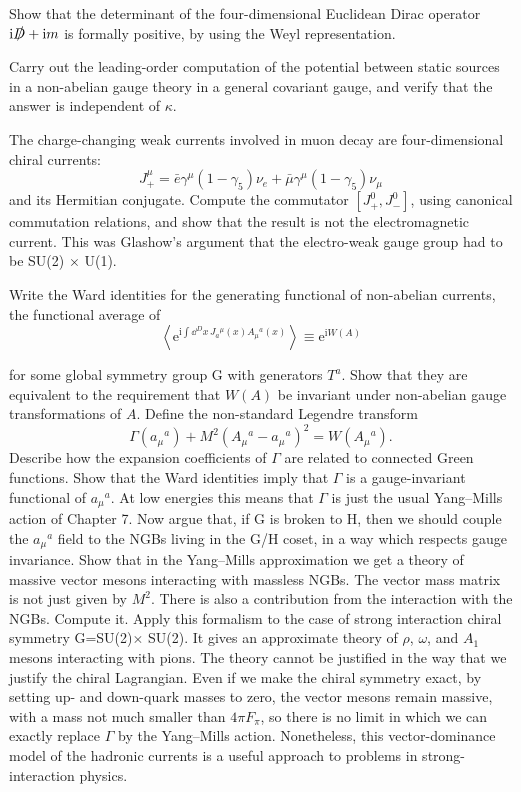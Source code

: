 \begin{banksproblems}
Show that the determinant of the four-dimensional Euclidean Dirac operator
$\mathrm{i}\slashed D+\mathrm{i}m$ is formally positive, by using the Weyl
representation.

Carry out the leading-order computation of the potential between static
sources in a non-abelian gauge theory in a general covariant gauge, and verify
that the answer is independent of $\kappa$.

The charge-changing weak currents involved in muon decay are four-dimensional
chiral currents:
\[
  J_+^\mu=\bar e\gamma^\mu(1-\gamma_5)\nu_e
  +\bar\mu\gamma^\mu(1-\gamma_5)\nu_\mu
\]
and its Hermitian conjugate. Compute the commutator $[J_+^0,J_-^0]$, using
canonical commutation relations, and show that the result is not the
electromagnetic current. This was Glashow's argument that the electro-weak
gauge group had to be SU(2) $\times$ U(1).

Write the Ward identities for the generating functional of non-abelian
currents, the functional average of
\[
  \left\langle\mathrm{e}^{\mathrm{i}\int\dd^D x\,J_a{}^\mu(x)A_\mu{}^a(x)}\right\rangle
  \equiv\mathrm{e}^{\mathrm{i}W(A)}
\]

for some global symmetry group G with generators $T^a$. Show that they are
equivalent to the requirement that $W(A)$ be invariant under non-abelian gauge
transformations of $A$. Define the non-standard Legendre transform
\[
  \Gamma(a_\mu{}^a)+M^2(A_\mu{}^a-a_\mu{}^a)^2=W(A_\mu{}^a) .
\]
Describe how the expansion coefficients of $\Gamma$ are related to connected
Green functions. Show that the Ward identities imply that $\Gamma$ is a
gauge-invariant functional of $a_\mu{}^a$. At low energies this means that
$\Gamma$ is just the usual Yang--Mills action of Chapter 7. Now argue that,
if G is broken to H, then we should couple the $a_\mu{}^a$ field to the NGBs
living in the G/H coset, in a way which respects gauge invariance. Show that in
the Yang--Mills approximation we get a theory of massive vector mesons
interacting with massless NGBs. The vector mass matrix is not just given by
$M^2$. There is also a contribution from the interaction with the NGBs.
Compute it. Apply this formalism to the case of strong interaction chiral
symmetry G=SU(2)$\times$ SU(2). It gives an approximate theory of $\rho$,
$\omega$, and $A_1$ mesons interacting with pions. The theory cannot be
justified in the way that we justify the chiral Lagrangian. Even if we make
the chiral symmetry exact, by setting up- and down-quark masses to zero, the
vector mesons remain massive, with a mass not much smaller than $4\pi F_\pi$,
so there is no limit in which we can exactly replace $\Gamma$ by the
Yang--Mills action. Nonetheless, this vector-dominance model of the hadronic
currents is a useful approach to problems in strong-interaction physics.

\end{banksproblems}

